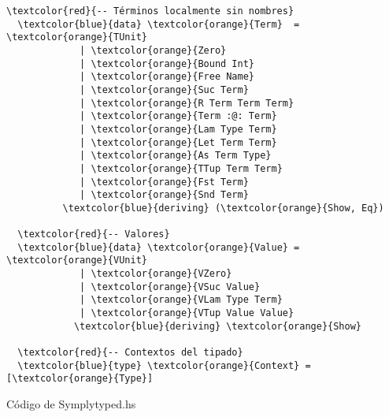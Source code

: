 \documentclass[12pt, a4paper]{article}
\begin{document}
\begin{Verbatim}[commandchars=\\\{\}]
  \textcolor{red}{-- Términos localmente sin nombres}
  \textcolor{blue}{data} \textcolor{orange}{Term}  = \textcolor{orange}{TUnit}
             | \textcolor{orange}{Zero}
             | \textcolor{orange}{Bound Int}
             | \textcolor{orange}{Free Name}
             | \textcolor{orange}{Suc Term}
             | \textcolor{orange}{R Term Term Term}
             | \textcolor{orange}{Term :@: Term}
             | \textcolor{orange}{Lam Type Term}
             | \textcolor{orange}{Let Term Term}
             | \textcolor{orange}{As Term Type}
             | \textcolor{orange}{TTup Term Term}
             | \textcolor{orange}{Fst Term}
             | \textcolor{orange}{Snd Term}
          \textcolor{blue}{deriving} (\textcolor{orange}{Show, Eq})

  \textcolor{red}{-- Valores}
  \textcolor{blue}{data} \textcolor{orange}{Value} = \textcolor{orange}{VUnit}
             | \textcolor{orange}{VZero}
             | \textcolor{orange}{VSuc Value}
             | \textcolor{orange}{VLam Type Term}
             | \textcolor{orange}{VTup Value Value}
            \textcolor{blue}{deriving} \textcolor{orange}{Show}

  \textcolor{red}{-- Contextos del tipado}
  \textcolor{blue}{type} \textcolor{orange}{Context} = [\textcolor{orange}{Type}]
\end{Verbatim}
Código de Symplytyped.hs
\vspace{-0.5cm}
\end{document}
